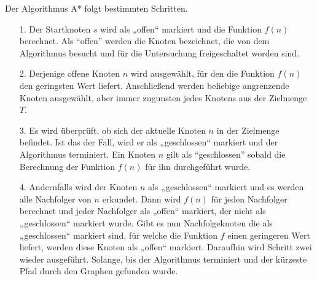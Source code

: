Der Algorithmus A* folgt bestimmten Schritten. 
\begin{itemize}
\item[1.] Der Startknoten $s$ wird als „offen“ markiert und die Funktion $f(n)$ berechnet. Als “offen” werden die Knoten bezeichnet, die von dem Algorithmus besucht und für die Untersuchung freigeschaltet worden sind.
\item[2.] Derjenige offene Knoten $n$ wird ausgewählt, für den die Funktion $f(n)$
den geringsten Wert liefert. Anschließend werden beliebige angrenzende Knoten ausgewählt, aber immer zugunsten jedes Knotens aus der Zielmenge $T$.
\item[3.] Es wird überprüft, ob sich der aktuelle Knoten $n$ in der Zielmenge befindet. Ist das der Fall, wird er als „geschlossen“ markiert und der Algorithmus terminiert. Ein Knoten $n$ gilt als “geschlossen” sobald die Berechnung der Funktion $f(n)$ für ihn durchgeführt wurde.
\item[4.]
Andernfalls wird der Knoten $n$ als „geschlossen“ markiert und es werden alle Nachfolger von $n$ erkundet. Dann wird $f(n)$ für jeden Nachfolger berechnet und jeder Nachfolger als „offen“ markiert, der nicht als „geschlossen“ markiert wurde. Gibt es nun Nachfolgeknoten die als „geschlossen“ markiert sind, für welche die Funktion $f$ einen geringeren Wert liefert, werden diese Knoten als „offen“ markiert. Daraufhin wird Schritt zwei wieder ausgeführt. Solange, bis der Algorithmus terminiert und der kürzeste Pfad durch den Graphen gefunden wurde\cite{HartNilssonandRaphael.1968}.
\end{itemize}
